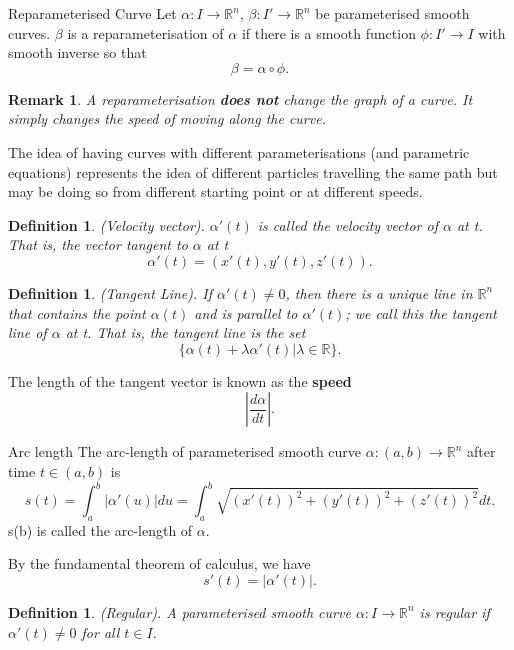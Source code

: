 \documentclass[twoside]{article}
\newtheorem{definition}[theorem]{Definition}
\newtheorem{remark}[theorem]{Remark}
\begin{document}
\begin{definition_exam}{Reparameterised Curve}{} Let $\alpha:I \rightarrow \mathbb{R}^n$, $\beta: I' \rightarrow \mathbb{R}^n$ be parameterised smooth curves. $\beta$ is a reparameterisation of $\alpha$ if there is a smooth function $\phi: I' \rightarrow I$ with smooth inverse so that $$\beta = \alpha \circ \phi.$$
\end{definition_exam}

\begin{remark}A reparameterisation \textbf{does not} change the graph of a curve. It simply changes the speed of moving along the curve.
\end{remark}

The idea of having curves with different parameterisations (and parametric equations) represents the idea of different particles travelling the same path but may be doing so from different starting point or at different speeds.

\begin{definition}(Velocity vector). $\alpha'(t)$ is called the velocity vector of $\alpha$ at t. That is, the vector tangent to $\alpha$ at t 
$$
\alpha'(t) = (x'(t),y'(t),z'(t)).
$$
\end{definition}

\begin{definition}(Tangent Line). If $\alpha'(t) \neq 0$, then there is a unique line in $\mathbb{R}^n$ that contains the point $\alpha(t)$ and is parallel to $\alpha'(t)$; we call this the tangent line of $\alpha$ at t. That is, the tangent line is the set 
$$
\{\alpha(t) + \lambda \alpha'(t)| \lambda \in \mathbb{R}\}.
$$
\end{definition}

The length of the tangent vector is known as the \textbf{speed}
$$
|\frac{d\alpha}{dt}|.
$$

\begin{definition_exam}{Arc length}{} The arc-length of parameterised smooth curve $\alpha: (a,b) \rightarrow \mathbb{R}^n$ after time $t \in (a,b)$ is
$$
s(t) = \int_a^b|\alpha'(u)|du = \int_{a}^b\sqrt{(x'(t))^2 + (y'(t))^2 + (z'(t))^2}dt.
$$
s(b) is called the arc-length of $\alpha$.
\end{definition_exam}

By the fundamental theorem of calculus, we have 
$$
s'(t) = |\alpha'(t)|.
$$

\begin{definition}(Regular). A parameterised smooth curve $\alpha: I \rightarrow \mathbb{R}^n$ is regular if $\alpha'(t) \neq 0$ for all $t \in I.$
\end{definition}
\end{document}
